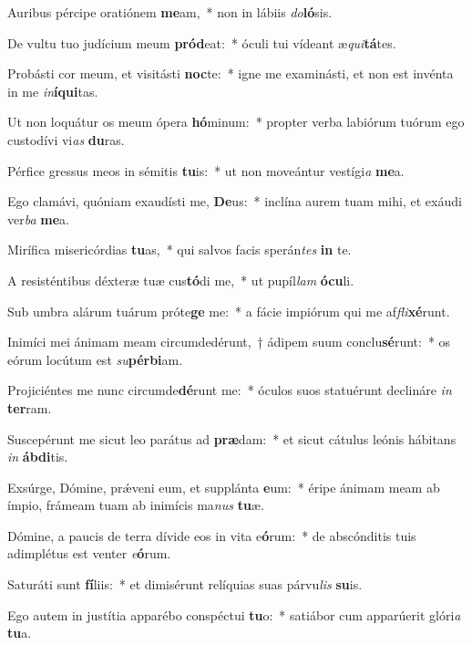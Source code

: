 \item Auribus pércipe oratiónem \textbf{me}am,~* non in lábiis \textit{do}\textbf{ló}sis.
\item De vultu tuo judícium meum \textbf{pród}eat:~* óculi tui vídeant æ\textit{qui}\textbf{tá}tes.
\item Probásti cor meum, et visitásti \textbf{noc}te:~* igne me examinásti, et non est invénta in me \textit{in}\textbf{í}\textbf{qui}tas.
\item Ut non loquátur os meum ópera \textbf{hó}minum:~* propter verba labiórum tuórum ego custodívi vi\textit{as} \textbf{du}ras.
\item Pérfice gressus meos in sémitis \textbf{tu}is:~* ut non moveántur vestígi\textit{a} \textbf{me}a.
\item Ego clamávi, quóniam exaudísti me, \textbf{De}us:~* inclína aurem tuam mihi, et exáudi ver\textit{ba} \textbf{me}a.
\item Mirífica misericórdias \textbf{tu}as,~* qui salvos facis sperán\textit{tes} \textbf{in} te.
\item A resisténtibus déxteræ tuæ cus\textbf{tó}di me,~* ut pupíl\textit{lam} \textbf{ó}\textbf{cu}li.
\item Sub umbra alárum tuárum próte\textbf{ge} me:~* a fácie impiórum qui me af\textit{fli}\textbf{xé}runt.
\item Inimíci mei ánimam meam circumdedérunt,~† ádipem suum conclu\textbf{sé}runt:~* os eórum locútum est \textit{su}\textbf{pér}\textbf{bi}am.
\item Projiciéntes me nunc circumde\textbf{dé}runt me:~* óculos suos statuérunt declináre \textit{in} \textbf{ter}ram.
\item Suscepérunt me sicut leo parátus ad \textbf{præ}dam:~* et sicut cátulus leónis hábitans \textit{in} \textbf{áb}\textbf{di}tis.
\item Exsúrge, Dómine, prǽveni eum, et supplánta \textbf{e}um:~* éripe ánimam meam ab ímpio, frámeam tuam ab inimícis ma\textit{nus} \textbf{tu}æ.
\item Dómine, a paucis de terra dívide eos in vita e\textbf{ó}rum:~* de abscónditis tuis adimplétus est venter \textit{e}\textbf{ó}rum.
\item Saturáti sunt \textbf{fí}liis:~* et dimisérunt relíquias suas párvu\textit{lis} \textbf{su}is.
\item Ego autem in justítia apparébo conspéctui \textbf{tu}o:~* satiábor cum apparúerit glóri\textit{a} \textbf{tu}a.
